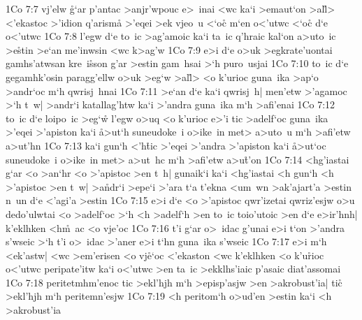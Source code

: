 \vs 1Co 7:7
vj'elw
\r{g}`ar
p'antac
>anjr'wpouc
e>~inai
<wc
ka`i
>emaut`on
>al\r{l}>
<'ekastoc
>'idion
q'arisma\r{}
>'eqei
>ek
vjeo~u
<`o\r{c}
m`en
o<'utwc
<`o\r{c}
d`e
o<'utwc\bibvsend
\vs 1Co 7:8
l'egw
d`e
to~ic
>ag'amoic
ka`i
ta~ic
q'hraic
kal`on
a>uto~ic
>e\r{s}tin
>e`an
me'inwsin
<wc
k>ag'w\bibvsend
\vs 1Co 7:9
e>i
d`e
o>uk
>egkrate'uontai
gamhs'atwsan
kre~i\r{s}son
g'ar
>estin
gam~hsai
>`h
puro~usjai\bibvsend
\vs 1Co 7:10
to~ic
d`e
gegamhk'osin
paragg'ellw
o>uk
>eg`w
>al\r{l}>
<o
k'urioc
guna~ika
>ap`o
>andr`oc
m`h
qwrisj~hnai\bibvsend
\vs 1Co 7:11
>e`an
d`e
ka`i
qwrisj~h|
men'etw
>'agamoc
>`h
t~w|
>andr`i
katallag'htw
ka`i
>'andra
guna~ika
m`h
>afi'enai\bibvsend
\vs 1Co 7:12
to~ic
d`e
loipo~ic
>eg`w\r{}
l'egw
o>uq
<o
k'urioc
e>'i
tic
>adelf`oc
guna~ika
>'eqei
>'apiston
ka`i
\r{a}>ut`h
suneudoke~i
o>ike~in
met>
a>uto~u
m`h
>afi'etw
a>ut'hn\bibvsend
\vs 1Co 7:13
ka`i
gun`h
<'h\r{t}ic
>'eqei
>'andra
>'apiston
ka`i
\r{a}>ut`oc
suneudoke~i
o>ike~in
met>
a>ut~hc
m`h
>afi'etw
a>u\r{t}'on\bibvsend
{}
\vs 1Co 7:14
<hg'iastai
g`ar
<o
>an`hr
<o
>'apistoc
>en
t~h|
gunaik`i
ka`i
<hg'iastai
<h
gun`h
<h
>'apistoc
>en
t~w|
>a\r{n}dr`i
>epe`i
>'ara
t`a
t'ekna
<um~wn
>ak'ajart'a
>estin
n~un
d`e
<'agi'a
>estin\bibvsend
\vs 1Co 7:15
e>i
d`e
<o
>'apistoc
qwr'izetai
qwriz'esjw
o>u
dedo'ulwtai
<o
>adelf`oc
>`h
<h
>adelf`h
>en
to~ic
toio'utoic
>en
d`e
e>ir'hnh|
k'eklhken
<h\r{m}~ac
<o
vje'oc\bibvsend
\vs 1Co 7:16
t'i
g`ar
o>~idac
g'unai
e>i
t`on
>'andra
s'wseic
>`h
t'i
o>~idac
>'aner
e>i
t`hn
guna~ika
s'wseic\bibvsend
\vs 1Co 7:17
e>i
m`h
<ek'astw|
<wc
>em'erisen
<o
vj\r{e}`oc
<'ekaston
<wc
k'eklhken
<o
k'u\r{r}ioc
o<'utwc
peripate'itw
ka`i
o<'utwc
>en
ta~ic
>ekklhs'iaic
p'asaic
diat'assomai\bibvsend
\vs 1Co 7:18
peritetmhm'enoc
tic
>ekl'hjh
m`h
>episp'asjw
>en
>akrobust'ia|
tic\r{}
>ekl'hjh
m`h
peritemn'esjw\bibvsend
\vs 1Co 7:19
<h
peritom`h
o>ud'en
>estin
ka`i
<h
>akrobust'ia
